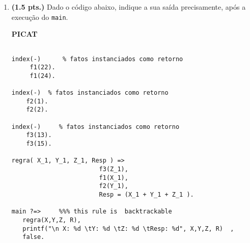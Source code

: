 \documentclass[11pt, a4paper,final]{article}
\begin{document}
\begin{enumerate}
\begin{comment}
Determine o valor verdade ($f_{aval}$  ou $\Phi $), passo-a-passo, das seguintes fórmulas:

\begin{enumerate}
\itemsep -2pt
\item $\forall x \exists y:~ \:\: p(x,y) $
\item $\forall x \forall y:~ \:\: p(x,y) $
\item $\exists x \forall y:~ \:\: p(x,y) $
\item $\exists y:~ \:\: \sim p(a,y) $
\item $\forall x \forall y:~ \:\: (p(x,y) \rightarrow p(y,x)) $
\item $\forall x:~  \:\: p(x,x) $
\end{enumerate}

\newpage
\end{comment}

  

\item {\bf (1.5 pts.)} Dado o código abaixo, indique a sua saída precisamente, após   a execução do \texttt{main}. 


\begin{minipage}{0.45\textwidth}
\begin{tiny}
\begin{center}{\bf PICAT}\end{center}
\begin{verbatim}

index(-)      % fatos instanciados como retorno
     f1(22).
     f1(24).
	
index(-)  % fatos instanciados como retorno
    f2(1).
    f2(2).
	
index(-)     % fatos instanciados como retorno
    f3(13).
    f3(15).
    
regra( X_1, Y_1, Z_1, Resp ) =>     
                      	f3(Z_1),
          	            f1(X_1),
          	            f2(Y_1),
          	            Resp = (X_1 + Y_1 + Z_1 ).

main ?=>     %%% this rule is  backtrackable
   regra(X,Y,Z, R),                            
   printf("\n X: %d \tY: %d \tZ: %d \tResp: %d", X,Y,Z, R)  ,  
   false.


\end{verbatim}
\end{tiny}
\end{minipage}
\end{enumerate}
\end{document}
